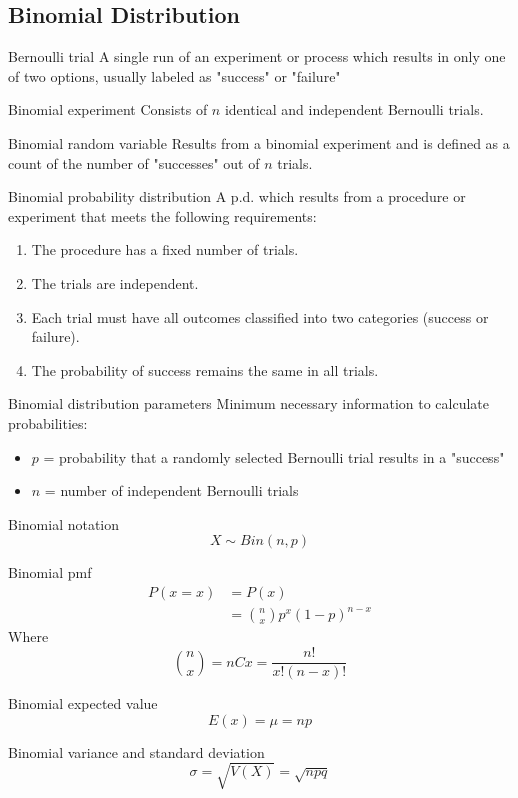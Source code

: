 \documentclass[]{article}
\newenvironment{definitions}{
	\begin{description}[font=\sffamily\bfseries, leftmargin=1cm, style=nextline]
	}{
	\end{description}
}
\begin{document}
\subsection{Binomial Distribution}
\begin{definitions}
	\item[Bernoulli trial]
	A single run of an experiment or process which results in only one of two options, usually labeled as "success" or "failure"
	\item[Binomial experiment]
	Consists of $n$ identical and independent Bernoulli trials.
	\item[Binomial random variable]
	Results from a binomial experiment and is defined as a count of the number of "successes" out of $n$ trials.
	\item[Binomial probability distribution]
	A p.d. which results from a procedure or experiment that meets the following requirements:
	\begin{enumerate}[itemsep=0pt]
		\item The procedure has a fixed number of trials.
		\item The trials are independent.
		\item Each trial must have all outcomes classified into two categories (success or failure).
		\item The probability of success remains the same in all trials.
	\end{enumerate}
	\item[Binomial distribution parameters]
	Minimum necessary information to calculate probabilities:
	\begin{itemize}[itemsep=0pt]
		\item $p$ = probability that a randomly selected Bernoulli trial results in a "success"
		\item $n$ = number of independent Bernoulli trials
	\end{itemize}
	\item[Binomial notation]
	\[ X \sim Bin(n,p)\]
	\item[Binomial pmf]
	\begin{align*}
		P(x = x) &= P(x)\\
		&= \binom{n}{x} p^x(1-p)^{n-x}
	\end{align*}
	Where
	\[ \binom{n}{x} = nCx = \frac{n!}{x!(n-x)!} \]
	\item[Binomial expected value]
	\[E(x) = \mu = np\]
	\item[Binomial variance and standard deviation]
	\[ \sigma = \sqrt{V(X)} = \sqrt{npq} \]
\end{definitions}
\end{document}
